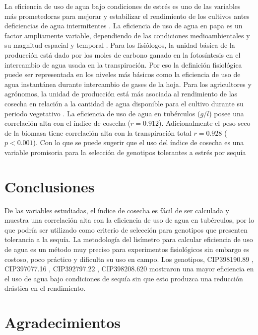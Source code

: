 \documentclass[fleqn,10pt]{Flavio}\usepackage[]{graphicx}\usepackage[]{color}
\begin{document}
La eficiencia de uso de agua bajo condiciones de estr\'es es uno de las variables m\'as prometedoras para mejorar y estabilizar el rendimiento de los cultivos antes deficiencias de agua intermitentes \citep{Bhatnagar-Mathur2007}. La eficiencia de uso de agua en papa es un factor ampliamente variable, dependiendo de las condiciones medioambientales y su magnitud espacial y temporal \citep{Monneveux2013}. Para los fisi\'ologos, la unidad b\'asica de la producci\'on est\'a dado por los moles de carbono ganado en la fotos\'intesis en el intercambio de agua usada en la transpiraci\'on. Por eso la definici\'on fisiol\'ogica puede ser representada en los niveles m\'as b\'asicos como la eficiencia de uso de agua instant\'anea durante intercambio de gases de la hoja. Para los agricultores y agr\'onomos, la unidad de producci\'on est\'a m\'as asociada al rendimiento de las cosecha en relaci\'on a la cantidad de agua disponible para el cultivo durante su periodo vegetativo \citep{Condon2004}. La eficiencia de uso de agua en tub\'erculos ($g/l$) posee una correlaci\'on alta con el \'indice de cosecha ($r = 0.912$). Adicionalmente el peso seco de la biomasa tiene correlaci\'on alta con la transpiraci\'on total $r = 0.928$ ($p < 0.001$). Con lo que se puede sugerir que el uso del \'indice de cosecha es una variable promisoria para la selecci\'on de genotipos tolerantes a estr\'es por sequ\'ia


\section{Conclusiones}

De las variables estudiadas, el \'indice de cosecha es f\'acil de ser calculada y muestra una correlaci\'on alta con la eficiencia de uso de agua en tub\'erculos, por lo que podr\'ia ser utilizado como criterio de selecci\'on para genotipos que presenten tolerancia a la sequ\'ia. La metodolog\'ia del lis\'imetro para calcular eficiencia de uso de agua es un m\'etodo muy preciso para experimentos fisiol\'ogicos sin embargo es costoso, poco pr\'actico y dificulta su uso en campo. Los genotipos, CIP398190.89 , CIP397077.16 , CIP392797.22 , CIP398208.620 mostraron una mayor eficiencia en el uso de agua bajo condiciones de sequ\'ia sin que esto produzca una reducci\'on dr\'astica en el rendimiento. 


\section*{Agradecimientos} %
\end{document}
